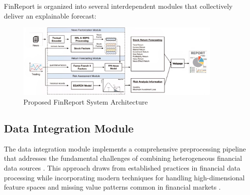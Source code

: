 \documentclass[3p,times,procedia]{elsarticle}
\begin{document}
FinReport is organized into several interdependent modules that collectively deliver an explainable forecast:
\begin{figure}[!ht] %
    \centering
    \includegraphics[width=0.90\textwidth]{flowchart.jpg} %

    \caption{Proposed FinReport System Architecture}
    \label{fig:workflow_diagram}
\end{figure}
\subsection{{Data Integration Module}}

The data integration module implements a comprehensive preprocessing pipeline that addresses the fundamental challenges of combining heterogeneous financial data sources \cite{Harvey2016}. This approach draws from established practices in financial data processing while incorporating modern techniques for handling high-dimensional feature spaces and missing value patterns common in financial markets \cite{Campbell2001}.
\end{document}

